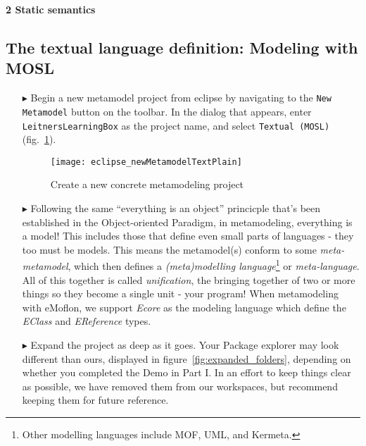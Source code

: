 \newpage
\texHeader

{\bf \Large 2 \hspace{0.5cm}Static semantics}

\subsection{The textual language definition: Modeling with MOSL}
\label{sec:staticConcrete}

\begin{itemize}

\item[$\blacktriangleright$] \hypertarget{static tex}{Begin a} new metamodel project from eclipse by navigating to the \texttt{New Metamodel} button on the toolbar. In the dialog that appears, enter \texttt{LeitnersLearningBox} as the project name, and select \texttt{Textual (MOSL)}  (fig.~\ref{fig:new_project}).

\begin{figure}[htbp]
	\centering
  \texttt{[image: eclipse\_newMetamodelTextPlain]}
	\caption{Create a new concrete metamodeling project}
	\label{fig:new_project}
\end{figure}

\item[$\blacktriangleright$] Following 
 the same ``everything is an object'' princicple that's been established in the Object-oriented Paradigm, in metamodeling, everything is a model! This
  includes those that define even small parts of languages - they too must be models. This means the metamodel(s) conform to some \emph{meta-metamodel}, 
which then defines a \emph{(meta)modelling language}\footnote{Other modelling languages include MOF, UML, and Kermeta.} or \emph{meta-language}. All of this together is called \emph{unification}, the bringing together of two or more things so they become a single unit - your program! When metamodeling with eMoflon, we support \emph{Ecore} as the modeling language which define the \emph{EClass} and \emph{EReference} types.

\item[$\blacktriangleright$] Expand the project as deep as it goes. Your Package explorer may look different than ours, displayed in figure~\ref{fig:expanded_folders}, depending on whether you completed the Demo in Part I. In an effort to keep things clear as possible, we have removed them from our workspaces, but recommend keeping them for future reference.


\end{itemize}
